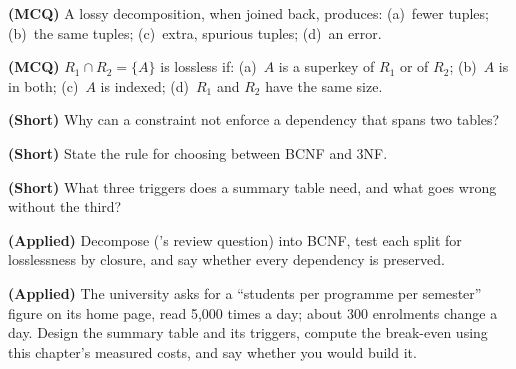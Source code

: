\begin{reviewq}
  \item \textbf{(MCQ)} A lossy decomposition, when joined back, produces:
        (a)~fewer tuples; (b)~the same tuples; (c)~extra, spurious tuples;
        (d)~an error.
  \item \textbf{(MCQ)} $R_1 \cap R_2 = \{A\}$ is lossless if: (a)~$A$ is a
        superkey of $R_1$ or of $R_2$; (b)~$A$ is in both; (c)~$A$ is
        indexed; (d)~$R_1$ and $R_2$ have the same size.
  \item \textbf{(Short)} Why can a  constraint not enforce a
        dependency that spans two tables?
  \item \textbf{(Short)} State the rule for choosing between BCNF and 3NF.
  \item \textbf{(Short)} What three triggers does a summary table need, and
        what goes wrong without the third?
  \item \textbf{(Applied)} Decompose
        ('s review question) into BCNF, test each split for
        losslessness by closure, and say whether every dependency is
        preserved.
  \item \textbf{(Applied)} The university asks for a ``students per
        programme per semester'' figure on its home page, read 5{,}000 times a
        day; about 300 enrolments change a day. Design the summary table and
        its triggers, compute the break-even using this chapter's measured
        costs, and say whether you would build it.
\end{reviewq}
